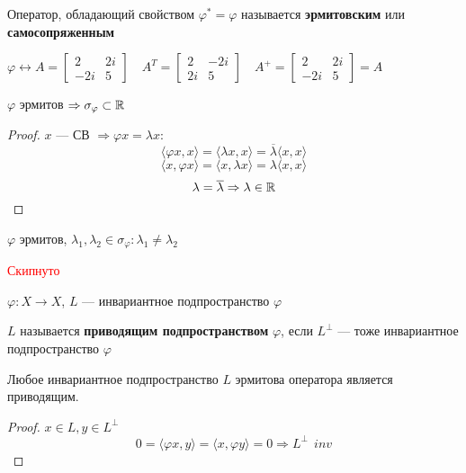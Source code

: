 \begin{definition}
    Оператор, обладающий свойством $\varphi^*=\varphi$ называется \textbf{эрмитовским} или \textbf{самосопряженным}
\end{definition}

\begin{example}
    $\varphi\leftrightarrow A = \begin{bmatrix}
            2   & 2i \\
            -2i & 5
        \end{bmatrix} \quad A^T = \begin{bmatrix}
            2  & -2i \\
            2i & 5
        \end{bmatrix} \quad A^+ = \begin{bmatrix}
            2   & 2i \\
            -2i & 5
        \end{bmatrix} = A$
\end{example}

\begin{lemma}
    $\varphi$ эрмитов $\Rightarrow \sigma_\varphi\subset\mathbb{R}$
\end{lemma}
\begin{proof}
    $x$ --- СВ $\Rightarrow \varphi x = \lambda x$:
    $$\langle \varphi x, x \rangle = \langle \lambda x, x \rangle = \overline \lambda \langle x, x \rangle$$
    $$\langle x, \varphi x \rangle = \langle x, \lambda x \rangle = \lambda \langle x, x \rangle$$
    $$\lambda = \overline \lambda \Rightarrow \lambda\in\mathbb{R}$$
\end{proof}

\begin{lemma}
    $\varphi$ эрмитов, $\lambda_1, \lambda_2\in\sigma_\varphi : \lambda_1 \not= \lambda_2$

    \textcolor{red}{Скипнуто}
\end{lemma}

\begin{definition}
    $\varphi : X \to X$, $L$ --- инвариантное подпространство $\varphi$

    $L$ называется \textbf{приводящим подпространством} $\varphi$, если $L^\perp$ --- тоже инвариантное подпространство $\varphi$
\end{definition}

\begin{lemma}
    Любое инвариантное подпространство $L$ эрмитова оператора является приводящим.
\end{lemma}
\begin{proof}
    $x\in L, y\in L^\perp$
    $$0 = \langle \varphi x, y \rangle = \langle x, \varphi y \rangle = 0 \Rightarrow L^\perp\ \ inv$$
\end{proof}

